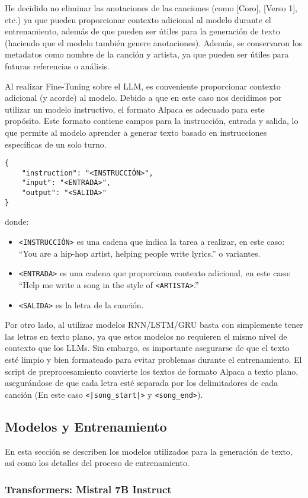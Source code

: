 \documentclass[paper=letter, fontsize=11pt, draft=false]{scrartcl}
\numberwithin{equation}{section} %
\numberwithin{figure}{section} %
\numberwithin{table}{section} %
\numberwithin{subsection}{section}
\begin{document}
He decidido no eliminar las anotaciones de las canciones (como [Coro], [Verso 1], etc.) ya que pueden proporcionar contexto adicional al modelo durante el entrenamiento, además de que pueden ser útiles para la generación de texto (haciendo que el modelo también genere anotaciones). Además, se conservaron los metadatos como nombre de la canción y artista, ya que pueden ser útiles para futuras referencias o análisis.

Al realizar Fine-Tuning sobre el LLM, es conveniente proporcionar contexto adicional (y acorde) al modelo. Debido a que en este caso nos decidimos por utilizar un modelo instructivo, el formato Alpaca es adecuado para este propósito. Este formato contiene campos para la instrucción, entrada y salida, lo que permite al modelo aprender a generar texto basado en instrucciones específicas de un solo turno.
\begin{verbatim}
{
    "instruction": "<INSTRUCCIÓN>",
    "input": "<ENTRADA>",
    "output": "<SALIDA>"
}
\end{verbatim}

donde:
\begin{itemize} 
    \item \texttt{<INSTRUCCIÓN>} es una cadena que indica la tarea a realizar, en este caso: ``You are a hip-hop artist, helping people write lyrics.'' o variantes.
    \item \texttt{<ENTRADA>} es una cadena que proporciona contexto adicional, en este caso: ``Help me write a song in the style of \texttt{<ARTISTA>}.''
    \item \texttt{<SALIDA>} es la letra de la canción.
\end{itemize}

Por otro lado, al utilizar modelos RNN/LSTM/GRU basta con simplemente tener las letras en texto plano, ya que estos modelos no requieren el mismo nivel de contexto que los LLMs. Sin embargo, es importante asegurarse de que el texto esté limpio y bien formateado para evitar problemas durante el entrenamiento. El script de preprocesamiento convierte los textos de formato Alpaca a texto plano, asegurándose de que cada letra esté separada por los delimitadores de cada canción (En este caso \texttt{<|song\_start|>} y \texttt{<song\_end>}).



\subsection{Modelos y Entrenamiento}

En esta sección se describen los modelos utilizados para la generación de texto, así como los detalles del proceso de entrenamiento.

\subsubsection{Transformers: Mistral 7B Instruct}
\end{document}
